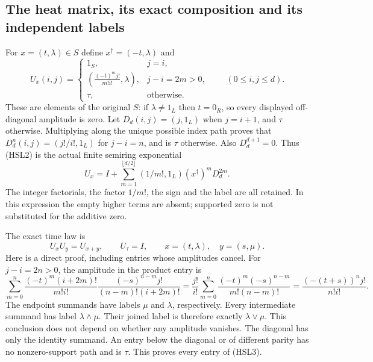 \subsection{The heat matrix, its exact composition and its independent labels}

For $x=(t,\lambda)\in S$ define $x^\dagger=(-t,\lambda)$ and
\begin{equation}\tag{HSL2}
 U_x(i,j)=
 \begin{cases}
  1_S,&j=i,\\
  \left(\displaystyle\frac{(-t)^m j!}{m!i!},\lambda\right),
       &j-i=2m>0,\\
  \tau,&\text{otherwise}.
 \end{cases}
 \qquad(0\le i,j\le d).
\end{equation}
These are elements of the original $S$: if $\lambda\ne1_L$
then $t=0_R$, so every displayed off-diagonal amplitude is zero.
Let $D_d(i,j)=(j,1_L)$ when $j=i+1$, and $\tau$ otherwise.
Multiplying along the unique possible index path proves that
$D_d^n(i,j)=(j!/i!,1_L)$ for $j-i=n$, and is $\tau$ otherwise.
Also $D_d^{d+1}=0$. Thus (HSL2) is the actual finite semiring
exponential
\[
 U_x=I+\sum_{m=1}^{\lfloor d/2\rfloor}
       (1/m!,1_L)(x^\dagger)^mD_d^{2m}.
\]
The integer factorials, the factor $1/m!$, the sign and the label
are all retained. In this expression the empty higher terms are
absent; supported zero is not substituted for the additive zero.

The exact time law is
\begin{equation}\tag{HSL3}
 U_xU_y=U_{x+y},\qquad U_\tau=I,
 \qquad x=(t,\lambda),\quad y=(s,\mu).
\end{equation}
Here is a direct proof, including entries whose amplitudes cancel.
For $j-i=2n>0$, the amplitude in the product entry is
\[
 \sum_{m=0}^{n}
 \frac{(-t)^m(i+2m)!}{m!i!}
 \frac{(-s)^{n-m}j!}{(n-m)!(i+2m)!}
 =
 \frac{j!}{i!}\sum_{m=0}^{n}
       \frac{(-t)^m(-s)^{n-m}}{m!(n-m)!}
 =
 \frac{(-(t+s))^n j!}{n!i!}.
\]
The endpoint summands have labels $\mu$ and $\lambda$,
respectively. Every intermediate summand has label
$\lambda\wedge\mu$. Their joined label is therefore exactly
$\lambda\vee\mu$. This conclusion does not depend on whether
any amplitude vanishes. The diagonal has only the identity
summand. An entry below the diagonal or of different parity
has no nonzero-support path and is $\tau$.
This proves every entry of (HSL3).

